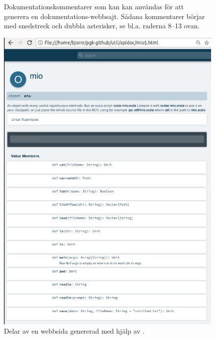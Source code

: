 
\begin{figure}[b]
    \caption{Dokumentationskommentarer som kan kan användas för att generera en dokumentations-webbsajt. Sådana kommentarer börjar  med snedstreck och dubbla asterisker, se bl.a. raderna 8--13 ovan.}
    \label{fig:scaladoc:mio}
\end{figure}

\begin{figure}[t]
\includegraphics[width=1.0\textwidth]{../img/scaladoc/scaladoc-mio}
    \caption{Delar av en webbsida genererad med hjälp av \scaladoc. %
    }
    \label{fig:scaladoc:webpage}
\end{figure}


